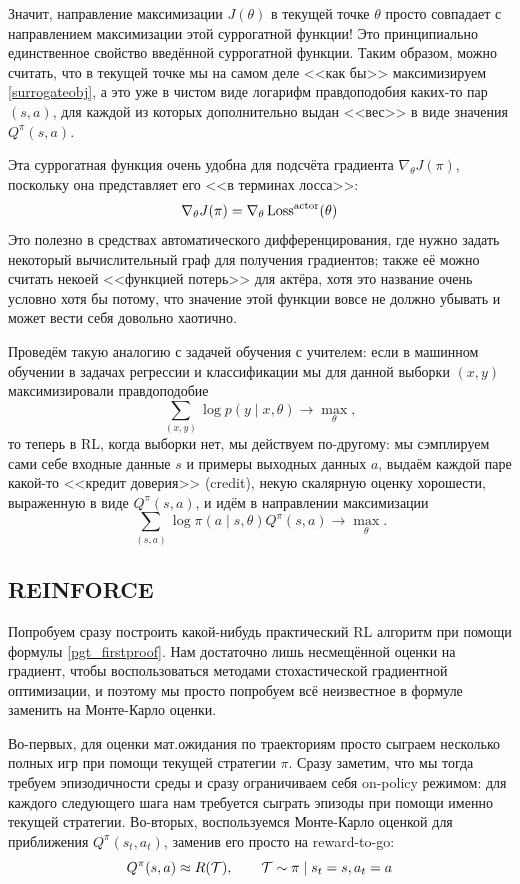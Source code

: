 Значит, направление максимизации $J(\theta)$ в текущей точке $\theta$ просто совпадает с направлением максимизации этой суррогатной функции! Это принципиально единственное свойство введённой суррогатной функции. Таким образом, можно считать, что в текущей точке мы на самом деле <<как бы>> максимизируем \eqref{surrogateobj}, а это уже в чистом виде логарифм правдоподобия каких-то пар $(s, a)$, для каждой из которых дополнительно выдан <<вес>> в виде значения $Q^{\pi}(s, a)$.

\begin{remark}
Эта суррогатная функция очень удобна для подсчёта градиента $\nabla_\theta J(\pi)$, поскольку она представляет его <<в терминах лосса>>:
$$\nabla_\theta J(\pi) = \nabla_\theta \operatorname{Loss}^{\mathrm{actor}}(\theta)$$
Это полезно в средствах автоматического дифференцирования, где нужно задать некоторый вычислительный граф для получения градиентов; также её можно считать некоей <<функцией потерь>> для актёра, хотя это название очень условно хотя бы потому, что значение этой функции вовсе не должно убывать и может вести себя довольно хаотично.
\end{remark}

Проведём такую аналогию с задачей обучения с учителем: если в машинном обучении в задачах регрессии и классификации мы для данной выборки $(x, y)$ максимизировали правдоподобие
$$\sum_{(x, y)} \log p(y \mid x, \theta) \to \max_{\theta},$$
то теперь в RL, когда выборки нет, мы действуем по-другому: мы сэмплируем сами себе входные данные $s$ и примеры выходных данных $a$, выдаём каждой паре какой-то <<кредит доверия>> (credit), некую скалярную оценку хорошести, выраженную в виде $Q^{\pi}(s, a)$, и идём в направлении максимизации
$$\sum_{(s, a)} \log \pi(a \mid s, \theta)Q^{\pi}(s, a) \to \max_{\theta}.$$

\subsection{REINFORCE}

Попробуем сразу построить какой-нибудь практический RL алгоритм при помощи формулы \eqref{pgt_firstproof}. Нам достаточно лишь несмещённой оценки на градиент, чтобы воспользоваться методами стохастической градиентной оптимизации, и поэтому мы просто попробуем всё неизвестное в формуле заменить на Монте-Карло оценки. 

Во-первых, для оценки мат.ожидания по траекториям просто сыграем несколько полных игр при помощи текущей стратегии $\pi$. Сразу заметим, что мы тогда требуем эпизодичности среды и сразу ограничиваем себя on-policy режимом: для каждого следующего шага нам требуется сыграть эпизоды при помощи именно текущей стратегии. Во-вторых, воспользуемся Монте-Карло оценкой для приближения $Q^\pi(s_t, a_t)$, заменив его просто на reward-to-go:
$$Q^\pi(s, a) \approx R(\mathcal{T}), \qquad \mathcal{T} \sim \pi \mid s_t = s, a_t = a$$

